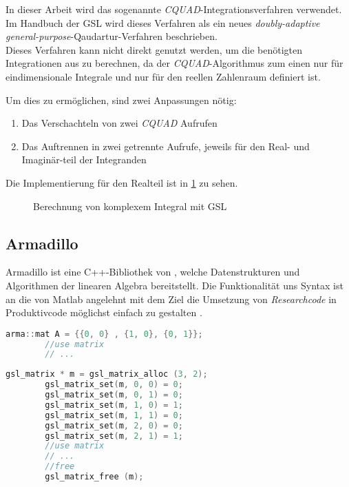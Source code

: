 
In dieser Arbeit wird das sogenannte \textit{CQUAD}-Integrationsverfahren verwendet.
Im Handbuch der GSL wird dieses Verfahren als ein neues \textit{doubly-adaptive general-purpose}-Qaudartur-Verfahren \cite*[Kapitel 17.11]{gsl} beschrieben.
\\
Dieses Verfahren kann nicht direkt genutzt werden, um die benötigten Integrationen aus \cite*{gasperini:hal-03209144} zu berechnen, da 
der \textit{CQUAD}-Algorithmus zum einen nur für eindimensionale Integrale und nur für den reellen Zahlenraum definiert ist.

Um dies zu ermöglichen, sind zwei Anpassungen nötig:
\begin{enumerate}
    \item Das Verschachteln von zwei \textit{CQUAD} Aufrufen
    \item Das Auftrennen in zwei getrennte Aufrufe, jeweils für den Real- und Imaginär-teil der Integranden
\end{enumerate}

Die Implementierung für den Realteil ist in \ref{integration_2d} zu sehen.

\begin{figure}
    
    \caption{Berechnung von komplexem Integral mit GSL}
    \label{integration_2d}
\end{figure}


\subsection{Armadillo}

Armadillo ist eine C++-Bibliothek von \citeauthor{armadillo}, welche Datenstrukturen und Algorithmen der linearen Algebra bereitstellt.
Die Funktionalität uns Syntax ist an die von Matlab angelehnt mit dem Ziel die Umsetzung von \textit{Researchcode} in Produktivcode möglichst einfach zu gestalten \cite{armadillo}.


\begin{center}
    \begin{lstlisting}[language=C++,style=cpp]
        arma::mat A = {{0, 0} , {1, 0}, {0, 1}};
        //use matrix 
        // ...
    \end{lstlisting}
    \begin{lstlisting}[language=C++,style=cpp]
        gsl_matrix * m = gsl_matrix_alloc (3, 2);
        gsl_matrix_set(m, 0, 0) = 0;
        gsl_matrix_set(m, 0, 1) = 0;
        gsl_matrix_set(m, 1, 0) = 1;
        gsl_matrix_set(m, 1, 1) = 0;
        gsl_matrix_set(m, 2, 0) = 0;
        gsl_matrix_set(m, 2, 1) = 1;
        //use matrix 
        // ...
        //free
        gsl_matrix_free (m);
    \end{lstlisting}
    \label{gslarma}
\end{center}

